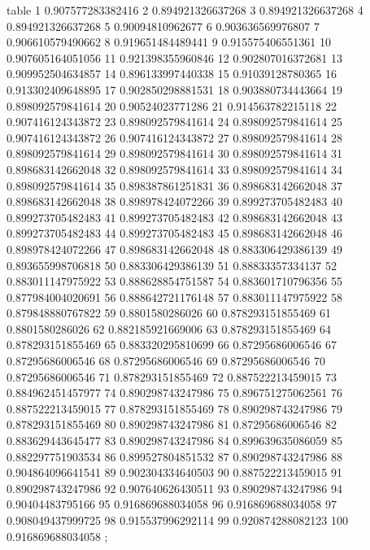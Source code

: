 table {%
	1 0.907577283382416
	2 0.894921326637268
	3 0.894921326637268
	4 0.894921326637268
	5 0.90094810962677
	6 0.903636569976807
	7 0.906610579490662
	8 0.919651484489441
	9 0.915575406551361
	10 0.907605164051056
	11 0.921398355960846
	12 0.902807016372681
	13 0.909952504634857
	14 0.896133997440338
	15 0.91039128780365
	16 0.913302409648895
	17 0.902850298881531
	18 0.903880734443664
	19 0.898092579841614
	20 0.90524023771286
	21 0.914563782215118
	22 0.907416124343872
	23 0.898092579841614
	24 0.898092579841614
	25 0.907416124343872
	26 0.907416124343872
	27 0.898092579841614
	28 0.898092579841614
	29 0.898092579841614
	30 0.898092579841614
	31 0.898683142662048
	32 0.898092579841614
	33 0.898092579841614
	34 0.898092579841614
	35 0.898387861251831
	36 0.898683142662048
	37 0.898683142662048
	38 0.898978424072266
	39 0.899273705482483
	40 0.899273705482483
	41 0.899273705482483
	42 0.898683142662048
	43 0.899273705482483
	44 0.899273705482483
	45 0.898683142662048
	46 0.898978424072266
	47 0.898683142662048
	48 0.883306429386139
	49 0.893655998706818
	50 0.883306429386139
	51 0.88833357334137
	52 0.883011147975922
	53 0.888628854751587
	54 0.883601710796356
	55 0.877984004020691
	56 0.888642721176148
	57 0.883011147975922
	58 0.879848880767822
	59 0.8801580286026
	60 0.878293151855469
	61 0.8801580286026
	62 0.882185921669006
	63 0.878293151855469
	64 0.878293151855469
	65 0.883320295810699
	66 0.87295686006546
	67 0.87295686006546
	68 0.87295686006546
	69 0.87295686006546
	70 0.87295686006546
	71 0.878293151855469
	72 0.887522213459015
	73 0.884962451457977
	74 0.890298743247986
	75 0.896751275062561
	76 0.887522213459015
	77 0.878293151855469
	78 0.890298743247986
	79 0.878293151855469
	80 0.890298743247986
	81 0.87295686006546
	82 0.883629443645477
	83 0.890298743247986
	84 0.899639635086059
	85 0.882297751903534
	86 0.899527804851532
	87 0.890298743247986
	88 0.904864096641541
	89 0.902304334640503
	90 0.887522213459015
	91 0.890298743247986
	92 0.907640626430511
	93 0.890298743247986
	94 0.90404483795166
	95 0.916869688034058
	96 0.916869688034058
	97 0.908049437999725
	98 0.915537996292114
	99 0.920874288082123
	100 0.916869688034058
};
